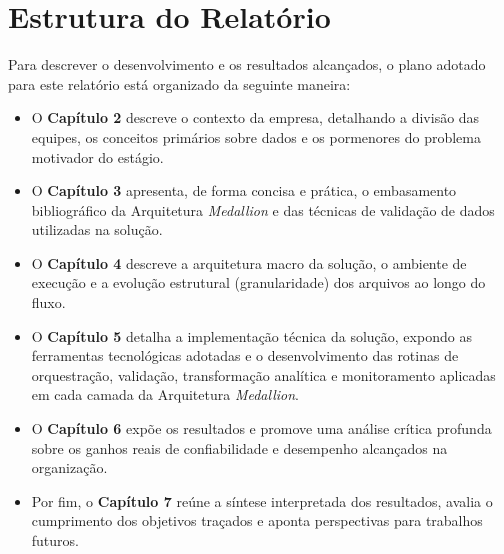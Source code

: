 \section{Estrutura do Relatório}
Para descrever o desenvolvimento e os resultados alcançados, o plano adotado para este relatório está organizado da seguinte maneira:
\begin{itemize}
    \item O \textbf{Capítulo 2} descreve o contexto da empresa, detalhando a divisão das equipes, os conceitos primários sobre dados e os pormenores do problema motivador do estágio.
    \item O \textbf{Capítulo 3} apresenta, de forma concisa e prática, o embasamento bibliográfico da Arquitetura \textit{Medallion} e das técnicas de validação de dados utilizadas na solução.
    \item O \textbf{Capítulo 4} descreve a arquitetura macro da solução, o ambiente de execução e a evolução estrutural (granularidade) dos arquivos ao longo do fluxo.
    \item O \textbf{Capítulo 5} detalha a implementação técnica da solução, expondo as ferramentas tecnológicas adotadas e o desenvolvimento das rotinas de orquestração, validação, transformação analítica e monitoramento aplicadas em cada camada da Arquitetura \textit{Medallion}.
    \item O \textbf{Capítulo 6} expõe os resultados e promove uma análise crítica profunda sobre os ganhos reais de confiabilidade e desempenho alcançados na organização.
    \item Por fim, o \textbf{Capítulo 7} reúne a síntese interpretada dos resultados, avalia o cumprimento dos objetivos traçados e aponta perspectivas para trabalhos futuros.
\end{itemize}